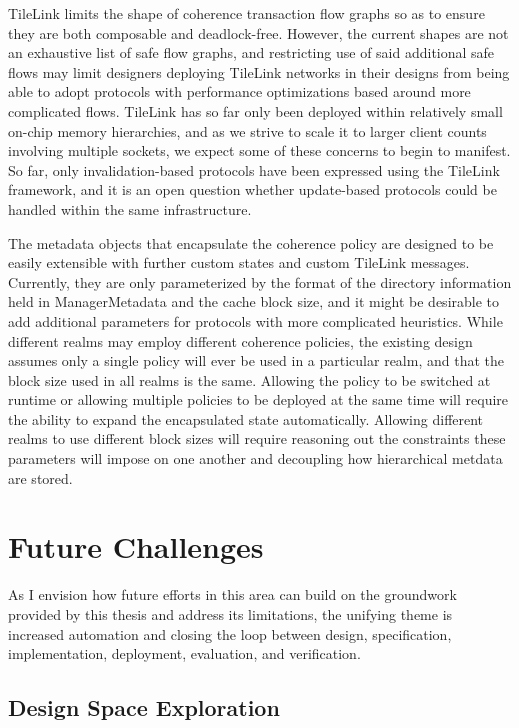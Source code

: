 TileLink limits the shape of coherence transaction flow graphs so as to ensure they are both composable and deadlock-free.
However, the current shapes are not an exhaustive list of safe flow graphs,
and restricting use of said additional safe flows may limit designers deploying TileLink networks in their designs
from being able to adopt protocols with performance optimizations based around more complicated flows.
TileLink has so far only been deployed within relatively small on-chip memory hierarchies,
and as we strive to scale it to larger client counts involving multiple sockets,
 we expect some of these concerns to begin to manifest. 
So far, only invalidation-based protocols have been expressed using the TileLink framework,
and it is an open question whether update-based protocols could be handled within the same infrastructure.

The metadata objects that encapsulate the coherence policy are designed to be easily extensible with
further custom states and custom TileLink messages.
Currently, they are only parameterized by the format of the directory information held in ManagerMetadata
and the cache block size,
and it might be desirable to add additional parameters for protocols with more complicated heuristics.
While different realms may employ different coherence policies,
the existing design assumes only a single policy will ever be used in a particular realm,
and that the block size used in all realms is the same.
Allowing the policy to be switched at runtime or allowing multiple policies to be deployed at the same time will require the ability to expand the encapsulated state automatically.
Allowing different realms to use different block sizes will require reasoning out the constraints these parameters will impose on one another and decoupling how hierarchical metdata are stored.

\section{Future Challenges}

As I envision how future efforts in this area can build on the groundwork provided by this thesis and address its limitations,
the unifying theme is increased automation and closing the loop between
design, specification, implementation, deployment, evaluation, and verification.

\subsection{Design Space Exploration}


